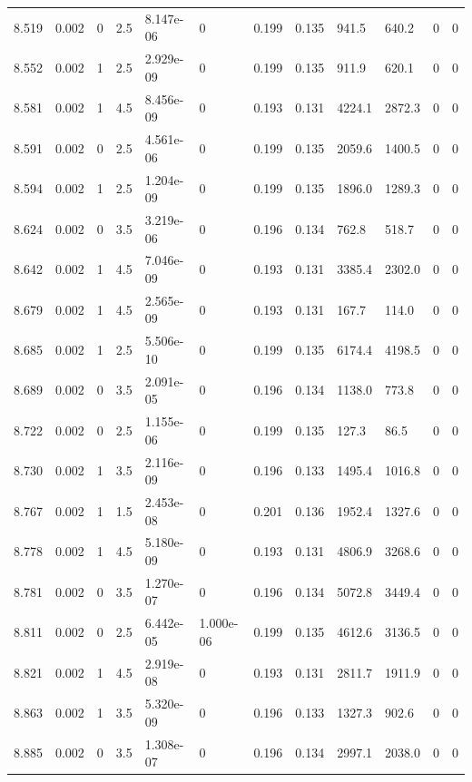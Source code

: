 \documentclass[preview]{standalone}
\begin{document}
{{{{{{{{{\begin{tabular}{L{1.2cm}C{1.2cm} C{0.3cm}C{0.5cm} C{1.4cm}C{1.4cm} C{1.4cm}C{1.4cm} C{1.6cm}C{1.6cm} C{1.6cm}C{1.6cm}}
  8.519  &  0.002  & 0     & 2.5 &  8.147e-06  & 0  &  0.199&   0.135& 941.5 & 640.2   &  0 & 0  \\ 
  8.552  &  0.002  & 1     & 2.5 &  2.929e-09  & 0  &  0.199&   0.135& 911.9 & 620.1   &  0 & 0  \\ 
  8.581  &  0.002  & 1     & 4.5 &  8.456e-09  & 0  &  0.193&   0.131& 4224.1 & 2872.3   &  0 & 0  \\ 
  8.591  &  0.002  & 0     & 2.5 &  4.561e-06  & 0  &  0.199&   0.135& 2059.6 & 1400.5   &  0 & 0  \\ 
  8.594  &  0.002  & 1     & 2.5 &  1.204e-09  & 0  &  0.199&   0.135& 1896.0 & 1289.3   &  0 & 0  \\ 
  8.624  &  0.002  & 0     & 3.5 &  3.219e-06  & 0  &  0.196&   0.134& 762.8 & 518.7   &  0 & 0  \\ 
  8.642  &  0.002  & 1     & 4.5 &  7.046e-09  & 0  &  0.193&   0.131& 3385.4 & 2302.0   &  0 & 0  \\ 
  8.679  &  0.002  & 1     & 4.5 &  2.565e-09  & 0  &  0.193&   0.131& 167.7 & 114.0   &  0 & 0  \\ 
  8.685  &  0.002  & 1     & 2.5 &  5.506e-10  & 0  &  0.199&   0.135& 6174.4 & 4198.5   &  0 & 0  \\ 
  8.689  &  0.002  & 0     & 3.5 &  2.091e-05  & 0  &  0.196&   0.134& 1138.0 & 773.8   &  0 & 0  \\ 
  8.722  &  0.002  & 0     & 2.5 &  1.155e-06  & 0  &  0.199&   0.135& 127.3 & 86.5   &  0 & 0  \\ 
  8.730  &  0.002  & 1     & 3.5 &  2.116e-09  & 0  &  0.196&   0.133& 1495.4 & 1016.8   &  0 & 0  \\ 
  8.767  &  0.002  & 1     & 1.5 &  2.453e-08  & 0  &  0.201&   0.136& 1952.4 & 1327.6   &  0 & 0  \\ 
  8.778  &  0.002  & 1     & 4.5 &  5.180e-09  & 0  &  0.193&   0.131& 4806.9 & 3268.6   &  0 & 0  \\ 
  8.781  &  0.002  & 0     & 3.5 &  1.270e-07  & 0  &  0.196&   0.134& 5072.8 & 3449.4   &  0 & 0  \\ 
  8.811  &  0.002  & 0     & 2.5 &  6.442e-05  & 1.000e-06  &  0.199&   0.135& 4612.6 & 3136.5   &  0 & 0  \\ 
  8.821  &  0.002  & 1     & 4.5 &  2.919e-08  & 0  &  0.193&   0.131& 2811.7 & 1911.9   &  0 & 0  \\ 
  8.863  &  0.002  & 1     & 3.5 &  5.320e-09  & 0  &  0.196&   0.133& 1327.3 & 902.6   &  0 & 0  \\ 
  8.885  &  0.002  & 0     & 3.5 &  1.308e-07  & 0  &  0.196&   0.134& 2997.1 & 2038.0   &  0 & 0  \\ 

\end{tabular}}}}}}}}}}
\end{document}
